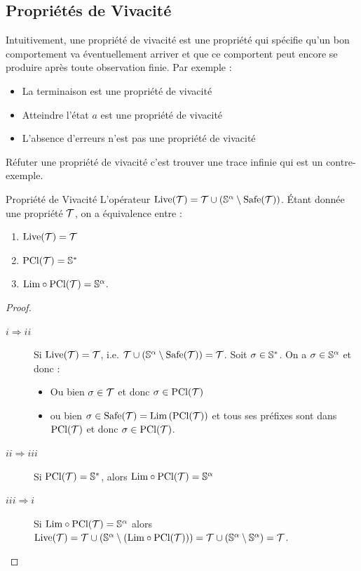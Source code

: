 \documentclass{cours}
\begin{document}
\subsection{Propriétés de Vivacité}
Intuitivement, une propriété de vivacité est une propriété qui spécifie qu'un bon comportement va éventuellement arriver et que ce comportent peut encore se produire après toute observation finie. Par exemple :
\begin{itemize}
	\item La terminaison est une propriété de vivacité
	\item Atteindre l'état $a$ est une propriété de vivacité
	\item L'absence d'erreurs n'est pas une propriété de vivacité
\end{itemize}
Réfuter une propriété de vivacité c'est trouver une trace infinie qui est un contre-exemple.
\begin{définition}{Propriété de Vivacité}{}
L'opérateur $\mathrm{Live}(\mT) = \mT \cup \left(\S^{\alpha} \setminus \mathrm{Safe}(\mT)\right)$. Étant donnée une propriété $\mT$, on a équivalence entre :
\begin{enumerate}
	\item $\mathrm{Live}(\mT) = \mT$
	\item $\mathrm{PCl}(\mT) = \S^{*}$
	\item $\rm Lim \circ PCl(\mT) = \S^{\alpha}$.
\end{enumerate}
\end{définition}
\begin{proof}
	\begin{description}
		\item[$i \Rightarrow ii$] Si $\rm Live(\mT) = \mT$, i.e. $\mT \cup \left(\S^{\alpha} \setminus \rm Safe(\mT)\right) = \mT$. Soit $\sigma \in \S^{*}$. On a $\sigma \in \S^{\alpha}$ et donc :
		      \begin{itemize}
			      \item Ou bien $\sigma \in \mT$ et donc $\sigma \in \rm PCl(\mT)$
			      \item ou bien $\sigma \in \rm Safe(\mT) = Lim\left(PCl(\mT)\right)$ et tous ses préfixes sont dans $\rm PCl(\mT)$ et donc $\sigma \in \rm PCl(\mT)$.
		      \end{itemize}
		\item[$ii \Rightarrow iii$] Si $\rm PCl(\mT) = \S^{*}$, alors $\rm Lim \circ PCl(\mT) = \S^{\alpha}$
		\item[$iii \Rightarrow i$] Si $\rm Lim \circ PCl(\mT) = \S^{\alpha}$ alors $\rm Live(\mT) = \mT \cup \left(\S^{\alpha} \setminus \left(\rm Lim \circ PCl(\mT)\right)\right) = \mT \cup \left(\S^{\alpha} \setminus \S^{\alpha}\right) = \mT$.
	\end{description}
\end{proof}
\end{document}
